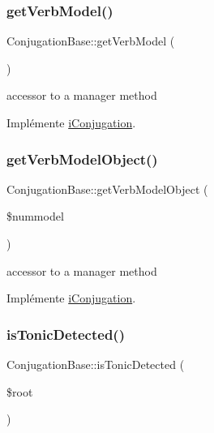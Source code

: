 \hypertarget{classConjugationBase_aaa7ecb3341682d48f2d2b42810de2ac2}{}\label{classConjugationBase_aaa7ecb3341682d48f2d2b42810de2ac2} 
\subsubsection{\texorpdfstring{get\+Verb\+Model()}{getVerbModel()}}
{\footnotesize\ttfamily Conjugation\+Base\+::get\+Verb\+Model (\begin{DoxyParamCaption}{ }\end{DoxyParamCaption})}

accessor to a manager method 

Implémente \hyperlink{interfaceiConjugation_ab5482cc8f8e9f58dc852aff604813b6e}{i\+Conjugation}.

\hypertarget{classConjugationBase_a31a6fb3f63b144c6d9f0e9a27d3d28cc}{}\label{classConjugationBase_a31a6fb3f63b144c6d9f0e9a27d3d28cc} 
\subsubsection{\texorpdfstring{get\+Verb\+Model\+Object()}{getVerbModelObject()}}
{\footnotesize\ttfamily Conjugation\+Base\+::get\+Verb\+Model\+Object (\begin{DoxyParamCaption}\item[{}]{\$nummodel }\end{DoxyParamCaption})}

accessor to a manager method 

Implémente \hyperlink{interfaceiConjugation}{i\+Conjugation}.

\hypertarget{classConjugationBase_a5fd0cc4d15523febc5eabfc41d8bdb21}{}\label{classConjugationBase_a5fd0cc4d15523febc5eabfc41d8bdb21} 
\subsubsection{\texorpdfstring{is\+Tonic\+Detected()}{isTonicDetected()}}
{\footnotesize\ttfamily Conjugation\+Base\+::is\+Tonic\+Detected (\begin{DoxyParamCaption}\item[{}]{\$root }\end{DoxyParamCaption})\hspace{0.3cm}{\ttfamily [protected]}}



